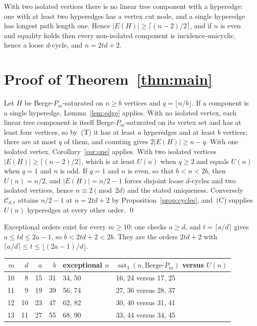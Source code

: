 \documentclass[11pt]{article}
\theoremstyle{definition}
\theoremstyle{remark}
\newcommand{\sat}{\operatorname{sat}}
\newcommand{\BP}{\text{Berge-}P}
\begin{document}
With two isolated vertices there is no linear tree component with a
hyperedge: one with at least two hyperedges has a vertex cut node, and a
single hyperedge has longest path length one. Hence
$|E(H)|\ge\lceil(n-2)/2\rceil$, and if $n$ is even and equality holds then
every non-isolated component is incidence-unicyclic, hence a loose
$d$-cycle, and $n=2td+2$.

\section{Proof of Theorem~\ref{thm:main}}

Let $H$ be Berge-$P_m$-saturated on $n\ge b$ vertices and $q=\lfloor n/b\rfloor$.
If a component is a single hyperedge, Lemma~\ref{lem:edge} applies. With no
isolated vertex, each linear tree component is itself Berge-$P_m$-saturated
on its vertex set and has at least four vertices, so by~(T) it has at least
$a$ hyperedges and at least $b$ vertices; there are at most $q$ of them, and
counting gives $2|E(H)|\ge n-q$. With one isolated vertex,
Corollary~\ref{cor:one} applies. With two isolated vertices
$|E(H)|\ge\lceil(n-2)/2\rceil$, which is at least $U(n)$ when $q\ge2$ and equals
$U(n)$ when $q=1$ and $n$ is odd. If $q=1$ and $n$ is even, so that
$b<n<2b$, then $U(n)=n/2$, and $|E(H)|=n/2-1$ forces disjoint loose
$d$-cycles and two isolated vertices, hence $n\equiv2\pmod{2d}$ and the
stated uniqueness. Conversely $\mathcal C_{d,t}$ attains $n/2-1$ at
$n=2td+2$ by Proposition~\ref{prop:cycles}, and~(C) supplies $U(n)$ hyperedges
at every other order. \qed

Exceptional orders exist for every $m\ge10$: one checks $a\ge d$, and
$t=\lceil a/d\rceil$ gives $a\le td\le 2a-1$, so $b<2td+2<2b$. They are the
orders $2td+2$ with $\lceil a/d\rceil\le t\le\lfloor (2a-1)/d\rfloor$.

\begin{center}
\begin{tabular}{rrrrll}
\toprule
$m$ & $d$ & $a$ & $b$ & exceptional $n$ & $\sat_3(n,\BP_m)$ versus $U(n)$\\
\midrule
10 & 8 & 15 & 31 & 34, 50 & 16, 24 versus 17, 25\\
11 & 9 & 19 & 39 & 56, 74 & 27, 36 versus 28, 37\\
12 & 10 & 23 & 47 & 62, 82 & 30, 40 versus 31, 41\\
13 & 11 & 27 & 55 & 68, 90 & 33, 44 versus 34, 45\\
\bottomrule
\end{tabular}
\end{center}
\end{document}

